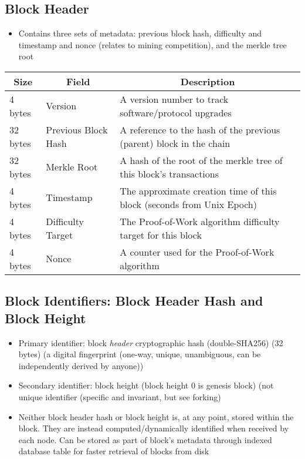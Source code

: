 \documentclass[english, 11pt]{article}
\begin{document}
\subsection{Block Header}
\begin{itemize}
    \item Contains three sets of metadata: previous block hash, difficulty and timestamp and nonce (relates to mining competition), and the merkle tree root
\end{itemize}

\begin{table}[htbp]
\begin{tabular}{|l|l|l|}
\hline
\multicolumn{1}{|c|}{\textbf{Size}} & \multicolumn{1}{c|}{\textbf{Field}} & \multicolumn{1}{c|}{\textbf{Description}} \\ \hline
4 bytes & Version & A version number to track software/protocol upgrades \\ \hline
32 bytes & Previous Block Hash & A reference to the hash of the previous (parent) block in the chain \\ \hline
32 bytes & Merkle Root & A hash of the root of the merkle tree of this block’s transactions \\ \hline
4 bytes & Timestamp & The approximate creation time of this block (seconds from Unix Epoch) \\ \hline
4 bytes & Difficulty Target & The Proof-of-Work algorithm difficulty target for this block \\ \hline
4 bytes & Nonce & A counter used for the Proof-of-Work algorithm \\ \hline
\end{tabular}
\end{table}

\subsection{Block Identifiers: Block Header Hash and Block Height}
\begin{itemize}
    \item Primary identifier: block \textit{header} cryptographic hash (double-SHA256) (32 bytes) (a digital fingerprint (one-way, unique, unambiguous, can be independently derived by anyone))
    \item Secondary identifier: block height (block height 0 is genesis block) (not unique identifier (specific and invariant, but see forking)
    \item Neither block header hash or block height is, at any point, stored within the block. They are instead computed/dynamically identified when received by each node. Can be stored as part of block's metadata through indexed database table for faster retrieval of blocks from disk
\end{itemize}
\end{document}
